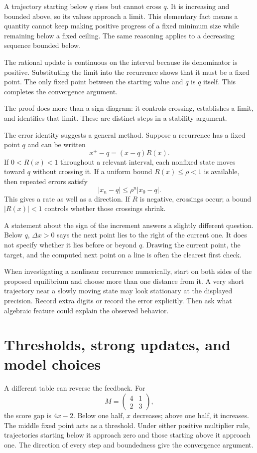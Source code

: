 \documentclass[11pt,oneside,openany]{book}
\theoremstyle{definition}
\theoremstyle{remark}
\numberwithin{equation}{chapter}
\begin{document}
A trajectory starting below \(q\) rises but cannot cross \(q\). It is increasing and bounded above, so its values approach a limit. This elementary fact means a quantity cannot keep making positive progress of a fixed minimum size while remaining below a fixed ceiling. The same reasoning applies to a decreasing sequence bounded below.

The rational update is continuous on the interval because its denominator is positive. Substituting the limit into the recurrence shows that it must be a fixed point. The only fixed point between the starting value and \(q\) is \(q\) itself. This completes the convergence argument.

The proof does more than a sign diagram: it controls crossing, establishes a limit, and identifies that limit. These are distinct steps in a stability argument.

The error identity suggests a general method. Suppose a recurrence has a fixed point \(q\) and can be written \[x^+-q=(x-q)R(x).\] If \(0<R(x)<1\) throughout a relevant interval, each nonfixed state moves toward \(q\) without crossing it. If a uniform bound \(R(x)\leq\rho<1\) is available, then repeated errors satisfy \[|x_n-q|\leq\rho^n|x_0-q|.\] This gives a rate as well as a direction. If \(R\) is negative, crossings occur; a bound \(|R(x)|<1\) controls whether those crossings shrink.

A statement about the sign of the increment answers a slightly different question. Below \(q\), \(\Delta x>0\) says the next point lies to the right of the current one. It does not specify whether it lies before or beyond \(q\). Drawing the current point, the target, and the computed next point on a line is often the clearest first check.

When investigating a nonlinear recurrence numerically, start on both sides of the proposed equilibrium and choose more than one distance from it. A very short trajectory near a slowly moving state may look stationary at the displayed precision. Record extra digits or record the error explicitly. Then ask what algebraic feature could explain the observed behavior.

\section{Thresholds, strong updates, and model choices}\label{ch02-thresholds-strong-updates-and-model-choices}

A different table can reverse the feedback. For \[M=\begin{pmatrix}4&1\\2&3\end{pmatrix},\] the score gap is \(4x-2\). Below one half, \(x\) decreases; above one half, it increases. The middle fixed point acts as a threshold. Under either positive multiplier rule, trajectories starting below it approach zero and those starting above it approach one. The direction of every step and boundedness give the convergence argument.
\end{document}
